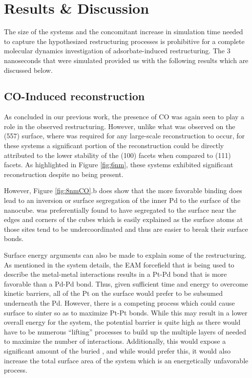 \section{Results \& Discussion}
The size of the systems and the concomitant increase in simulation time needed
to capture the hypothesized restructuring processes is prohibitive for a
complete molecular dynamics investigation of adsorbate-induced restructuring.
The 3 nanoseconds that were simulated provided us with the following results
which are discussed below.


\subsection{CO-Induced reconstruction}
As concluded in our previous work\citep{Michalka:2013aa}, the presence of CO
was again seen to play a role in the observed restructuring. However, unlike
what was observed on the  (557) surface, where  was required for
any large-scale reconstruction to occur, for these systems a significant
portion of the reconstruction could be directly attributed to the lower
stability of the (100) facets when compared to (111) facets. As highlighted in
Figure \ref{fig:6nm}, these systems exhibited significant reconstruction
despite no  being present. 

However, Figure \ref{fig:8nmCO}.b does show that the more favorable
 binding does lead to an inversion or surface segregation of
the inner Pd to the surface of the nanocube.  was preferentially found
to have segregated to the surface near the edges and corners of the cubes which
is easily explained as the surface atoms at those sites tend to be
undercoordinated and thus are easier to break their surface bonds.

Surface energy arguments can also be made to explain some of the restructuring.
As mentioned in the system details, the EAM forcefield that is being used to
describe the metal-metal interactions results in a Pt-Pd bond that is more
favorable than a Pd-Pd bond.  Thus, given sufficient time and energy to
overcome kinetic barriers, all of the Pt on the surface would prefer to be
subsumed underneath the Pd. However, there is a competing process which could
cause surface  to sinter so as to maximize Pt-Pt bonds. While this may
result in a lower overall energy for the system, the potential barrier is quite
high as there would have to be numerous ``lifting'' processes to build up the
multiple layers of  needed to maximize the number of 
interactions. Additionally, this would expose a significant amount of the
buried , and while  would prefer this, it would also increase
the total surface area of the system which is an energetically unfavorable
process.

